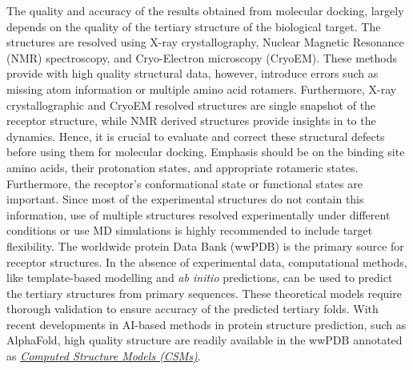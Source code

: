 \documentclass[10pt, a4paper]{book}
\begin{document}

The quality and accuracy of the results obtained from molecular docking, largely depends on the quality of the tertiary structure of the biological target. The structures are resolved using X-ray crystallography, Nuclear Magnetic Resonance (NMR) spectroscopy, and Cryo-Electron microscopy (CryoEM). These methods provide with high quality structural data, however, introduce errors such as missing atom information or multiple amino acid rotamers\cite{bib55, bib56}. Furthermore, X-ray crystallographic and CryoEM resolved structures are single snapshot of the receptor structure, while NMR derived structures provide insights in to the dynamics. Hence, it is crucial to evaluate and correct these structural defects before using them for molecular docking. Emphasis should be on the binding site amino acids, their protonation states, and appropriate rotameric states. Furthermore, the receptor's conformational state or functional states are important. Since most of the experimental structures do not contain this information, use of multiple structures resolved experimentally under different conditions or use MD simulations is highly recommended to include target flexibility. The worldwide protein Data Bank (wwPDB) is the primary source for receptor structures\cite{bib41}. In the absence of experimental data, computational methods, like template-based modelling and \textit{ab initio} predictions, can be used to predict the tertiary structures from primary sequences.  These theoretical models require thorough validation to ensure accuracy of the predicted tertiary folds. With recent developments in AI-based methods in protein structure prediction, such as AlphaFold\cite{bib37}, high quality structure are readily available in the wwPDB annotated as \href{https://pdb101.rcsb.org/learn/guide-to-understanding-pdb-data/computed-structure-models}{\textit{Computed Structure Models (CSMs)}}.
\end{document}
